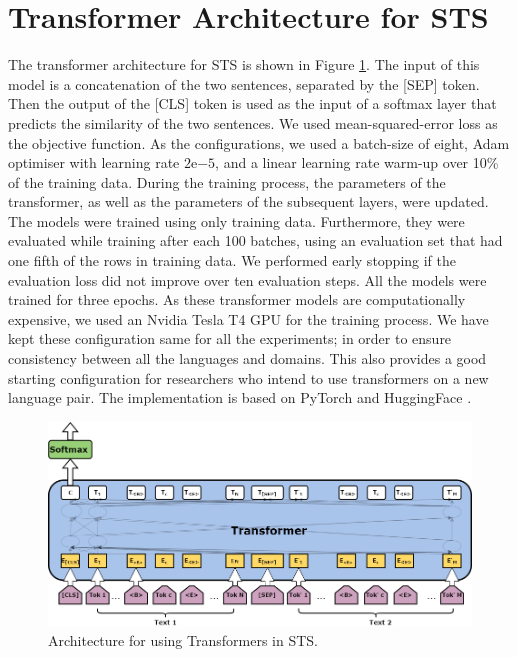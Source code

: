 \section{Transformer Architecture for STS}
\label{sec:transformer_method}

The transformer architecture for STS is shown in Figure \ref{fig:sts_transformers}. The input of this model is a concatenation of the two sentences, separated by the \textsc{[SEP]} token. Then the output of the \textsc{[CLS]} token is used as the input of a softmax layer that predicts the similarity of the two sentences. We used mean-squared-error loss as the objective function. As the configurations, we used a batch-size of eight, Adam optimiser with learning rate $2\mathrm{e}{-5}$, and a linear learning rate warm-up over 10\% of the training data. During the training process, the parameters of the transformer, as well as the parameters of the subsequent layers, were updated. The models were trained using only training data. Furthermore, they were evaluated while training after each 100 batches, using an evaluation set that had one fifth of the rows in training data. We performed early stopping if the evaluation loss did not improve over ten evaluation steps. All the models were trained for three epochs. As these transformer models are computationally expensive, we used an Nvidia Tesla T4 GPU for the training process. We have kept these configuration same for all the experiments; in order to ensure consistency between all the languages and domains. This also provides a good starting configuration for researchers who intend to use transformers on a new language pair. The implementation is based on PyTorch \autocite{NEURIPS2019_9015} and HuggingFace \autocite{wolf-etal-2020-transformers}.

\begin{figure}[ht]
	\centering
	\includegraphics[scale=0.4]{figures/semantic_textual_similarity/transformers/STSTransformers.png}
	\caption[Architecture for using Transformers in STS]{Architecture for using Transformers in STS.}
	\label{fig:sts_transformers}
\end{figure}

